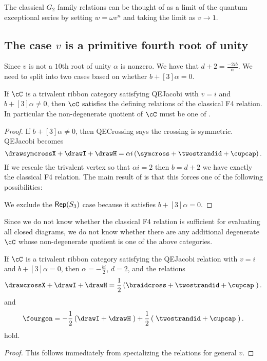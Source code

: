 \documentclass[12pt]{amsart}
\begin{document}
\begin{remark}
The classical $G_2$ family relations can be thought of as a limit of the quantum exceptional series by setting $w = \omega v^n$ and taking the limit as $v \rightarrow 1$.
\end{remark}

\subsection{The case \texorpdfstring{$v$}{v} is a primitive fourth root of unity}

Since $v$ is not a $10$th root of unity $\alpha$ is nonzero.  We have that $d+2 = \frac{-2ib}{\alpha}$.
We need to split into two cases based on whether $b+[3]\alpha = 0$.  

\begin{proposition}
If $\cC$ is a trivalent ribbon category satisfying QEJacobi with $v = i$ and $b+[3]\alpha \neq 0$, then $\cC$ satisfies the defining relations of the classical F4 relation.  In particular the non-degenerate quotient of $\cC$ must be one of .
\end{proposition}
\begin{proof}
If $b+[3]\alpha \neq 0$, then QECrossing says the crossing is symmetric.   QEJacobi becomes
$$\drawsymcrossX + \drawI + \drawH = \alpha i \left(\symcross + \twostrandid + \cupcap \right).$$  If we rescale the trivalent vertex so that $\alpha i = 2$ then $b = d+2$ we have exactly the classical F4 relation.  The main result of \cite{F4E6} is that this forces one of the following possibilities:


We exclude the $\operatorname{\mathsf{Rep}}(S_3)$ case because it satisfies $b+[3]\alpha = 0$.
\end{proof}

Since we do not know whether the classical F4 relation is sufficient for evaluating all closed diagrams, we do not know whether there are any additional degenerate $\cC$ whose non-degenerate quotient is one of the above categories.

\begin{lemma}
If $\cC$ is a trivalent ribbon category satisfying the QEJacobi relation with $v=i$ and $b+[3]\alpha = 0$, then $\alpha = -\frac{bi}{2}$, $d = 2$, and the relations
$$\drawcrossX + \drawI + \drawH = \frac{1}{2} \left(\braidcross + \twostrandid + \cupcap \;\right).$$
and 
$$\fourgon = -\frac{1}{2} \left(\drawI + \drawH \;\right) + \frac{1}{2} \left(\;\twostrandid + \cupcap \;\right).$$ hold.
\end{lemma}
\begin{proof}
This follows immediately from specializing the relations for general $v$.
\end{proof}
\end{document}
